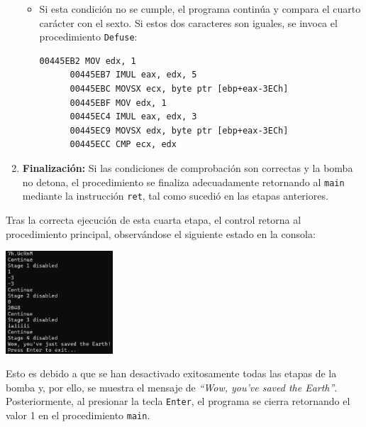 \documentclass[11pt,a4paper]{article}
\begin{document}
\begin{enumerate}
\begin{itemize}
    \item Si esta condición no se cumple, el programa continúa y compara el cuarto carácter con el sexto. Si estos dos caracteres son iguales, se invoca el procedimiento \texttt{Defuse}:\vspace{1ex}
    \begin{lstlisting}[style=assemblyStyle]
      00445EB2 MOV edx, 1
      00445EB7 IMUL eax, edx, 5
      00445EBC MOVSX ecx, byte ptr [ebp+eax-3ECh]
      00445EBF MOV edx, 1
      00445EC4 IMUL eax, edx, 3
      00445EC9 MOVSX edx, byte ptr [ebp+eax-3ECh]
      00445ECC CMP ecx, edx
    \end{lstlisting}
  \end{itemize}
  \vspace{1ex}

  \item \textbf{Finalización:} Si las condiciones de comprobación son correctas y la bomba no detona, el procedimiento se finaliza adecuadamente retornando al \texttt{main} mediante la instrucción \texttt{ret}, tal como sucedió en las etapas anteriores.
\end{enumerate}

\noindent Tras la correcta ejecución de esta cuarta etapa, el control retorna al procedimiento principal, observándose el siguiente estado en la consola:
\begin{center}
\includegraphics[width=0.3\textwidth]{s4-3.png}
\end{center}

\noindent Esto es debido a que se han desactivado exitosamente todas las etapas de la bomba y, por ello, se muestra el mensaje de \textit{``Wow, you've saved the Earth''}. Posteriormente, al presionar la tecla \texttt{Enter}, el programa se cierra retornando el valor 1 en el procedimiento \texttt{main}.\vspace{10ex}
\end{document}
